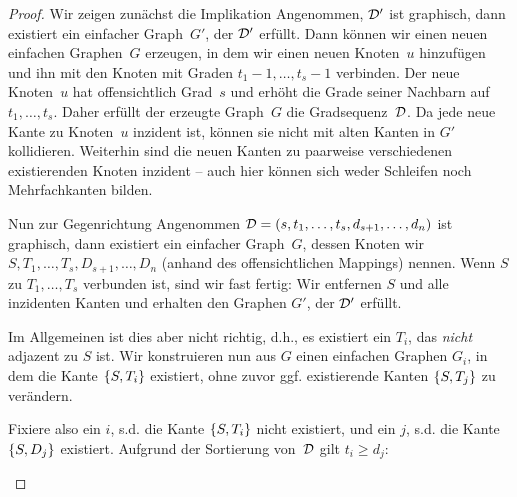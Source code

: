 \begin{proof}
    Wir  zeigen zunächst die Implikation 
    Angenommen, $\degseq'$ ist graphisch, dann existiert ein einfacher Graph~$G'$, der $\degseq'$ erfüllt.
    Dann können wir einen neuen einfachen Graphen~$G$ erzeugen, in dem wir einen neuen Knoten~$u$ hinzufügen und ihn mit den Knoten mit Graden $t_1{-}1, \ldots, t_s{-}1$ verbinden.
    Der neue Knoten~$u$ hat offensichtlich Grad~$s$ und erhöht die Grade seiner Nachbarn auf $t_1, \ldots, t_s$.
    Daher erfüllt der erzeugte Graph~$G$ die Gradsequenz~$\degseq$.
    Da jede neue Kante zu Knoten~$u$ inzident ist, können sie nicht mit alten Kanten in $G'$ kollidieren.
    Weiterhin sind die neuen Kanten zu paarweise verschiedenen existierenden Knoten inzident -- auch hier können sich weder Schleifen noch Mehrfachkanten bilden.

    Nun  zur Gegenrichtung 
    Angenommen $\degseq = (s, t_1, \ldots, t_s, d_{s+1}, \ldots, d_n)$ ist graphisch, dann existiert ein einfacher Graph~$G$, dessen Knoten wir $S, T_1, \ldots, T_s, D_{s+1}, \ldots, D_n$ (anhand des offensichtlichen Mappings) nennen.
    Wenn $S$ zu $T_1, \ldots, T_s$ verbunden ist, sind wir fast fertig: Wir entfernen $S$ und alle inzidenten Kanten und erhalten den Graphen $G'$, der $\degseq'$ erfüllt.

    Im Allgemeinen ist dies aber nicht richtig, d.h., es existiert ein $T_i$, das \emph{nicht} adjazent zu $S$ ist.
    Wir konstruieren nun aus $G$ einen einfachen Graphen $G_i$, in dem die Kante $\set{S, T_i}$ existiert, ohne zuvor ggf. existierende Kanten $\set{S, T_j}$ zu verändern.

    Fixiere also ein $i$, s.d. die Kante $\set{S, T_i}$ nicht existiert, und ein $j$, s.d. die Kante $\set{S, D_j}$ existiert.
    Aufgrund der Sortierung von~$\degseq$ gilt $t_i \ge d_j$:
    \begin{figure}
        \begin{center}
            \begin{tikzpicture}[
                    node distance=4em,
                    node/.style={draw, inner sep=0, minimum width=1.5em, minimum height=1.5em, circle},
                    edge/.style={draw, thick, black},
                    nonedge/.style={draw, dashed, red},
                ]


\end{tikzpicture}
\end{center}
\end{figure}
\end{proof}
